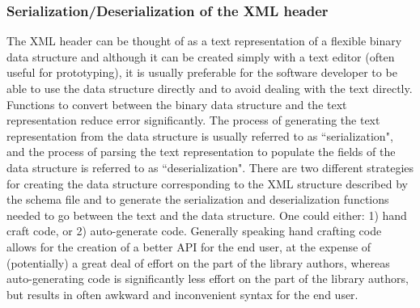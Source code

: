 \documentclass[12pt]{article}
\begin{document}
\subsubsection*{Serialization/Deserialization of the XML header}
The XML header can be thought of as a text representation of a flexible binary data structure and although it can be created simply with a text editor (often useful for prototyping), it is usually preferable for the software developer to be able to use the data structure directly and to avoid dealing with the text directly.  Functions to convert between the binary data structure and the text representation reduce error significantly.  The process of generating the text representation from the data structure is usually referred to as ``serialization", and the process of parsing the text representation to populate the fields of the data structure is referred to as ``deserialization".  There are two different strategies for creating the data structure corresponding to the XML structure described by the schema file and to generate the serialization and deserialization functions needed to go between the text and the data structure. One could either: 1) hand craft code, or 2) auto-generate code.  Generally speaking hand crafting code allows for the creation of a better API for the end user, at the expense of (potentially) a great deal of effort on the part of the library authors, whereas auto-generating code is significantly less effort on the part of the library authors, but results in often awkward and inconvenient syntax for the end user. 
\end{document}
